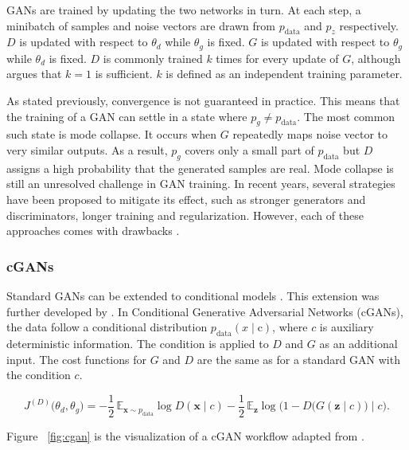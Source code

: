 GANs are trained by updating the two networks in turn. At each step, a minibatch of samples and noise vectors are drawn from $p_{\mathrm{data}}$ and $p_z$ respectively. $D$ is updated with respect to $\theta_d$ while $\theta_g$ is fixed. $G$ is updated with respect to $\theta_g$ while $\theta_d$ is fixed. $D$ is commonly trained $k$ times for every update of $G$, although \textcite{goodfellowNIPS2016Tutorial2017} argues that $k=1$ is sufficient. $k$ is defined as an independent training parameter.

As stated previously, convergence is not guaranteed in practice. This means that the training of a GAN can settle in a state where $p_g \neq p_{\mathrm{data}}$. The most common such state is mode collapse. It occurs when $G$ repeatedly maps noise vector to very similar outputs. As a result, $p_g$ covers only a small part of $p_{\mathrm{data}}$ but $D$ assigns a high probability that the generated samples are real. Mode collapse is still an unresolved challenge in GAN training. In recent years, several strategies have been proposed to mitigate its effect, such as stronger generators and discriminators, longer training and regularization. However, each of these approaches comes with drawbacks \parencite{barshaIndepthReviewAnalysis2025}.

\subsubsection{cGANs}
Standard GANs can be extended to conditional models \parencite{goodfellowGenerativeAdversarialNetworks2014}. This extension was further developed by \textcite{mirzaConditionalGenerativeAdversarial2014}. In Conditional Generative Adversarial Networks (cGANs), the data follow a conditional distribution $p_{\mathrm{data}}(x \mid \mathrm{c})$, where $c$ is auxiliary deterministic information. The condition is applied to $D$ and $G$ as an additional input.
The cost functions for $G$ and $D$ are the same as for a standard GAN with the condition $c$.

\begin{equation}
J^{(D)}\bigl(\theta_d, \theta_g\bigr)
= -\frac{1}{2}\,\mathbb{E}_{\boldsymbol{x} \sim p_{\text{data}}} \log D(\boldsymbol{x}\mid c)
  - \frac{1}{2}\,\mathbb{E}_{\boldsymbol{z}} \log\bigl(1 - D\bigl(G(\boldsymbol{z}\mid c)\bigr)\mid c\bigr).
\end{equation}

Figure ~\ref{fig:cgan} is the visualization of a cGAN workflow adapted from \parencite{vuleticFinGANForecastingClassifying2024}.

